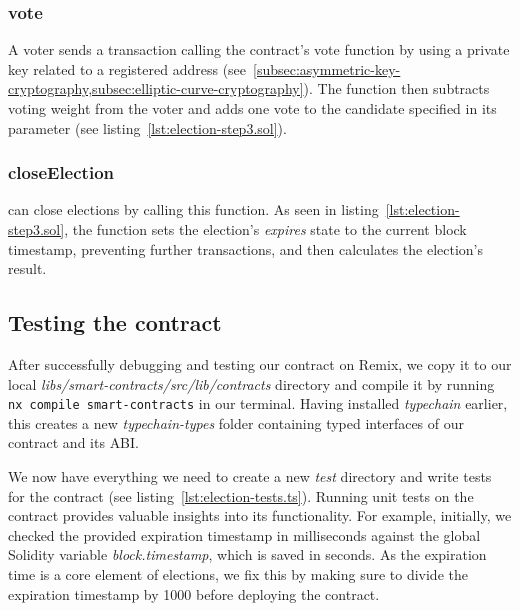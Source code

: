 \subsubsection{vote}

A voter sends a transaction calling the contract's vote function by using a private key related to a registered address (see~\cref{subsec:asymmetric-key-cryptography,subsec:elliptic-curve-cryptography}).
The function then subtracts voting weight from the voter and adds one vote to the candidate specified in its parameter (see listing~\ref{lst:election-step3.sol}).

\subsubsection{closeElection}

 can close elections by calling this function.
As seen in listing~\ref{lst:election-step3.sol}, the function sets the election's \emph{expires} state to the current block timestamp, preventing further transactions, and then calculates the election's result.

\subsection{Testing the contract}\label{subsec:testing-the-contract}

After successfully debugging and testing our contract on Remix, we copy it to our local \emph{libs/smart-contracts/src/lib/contracts} directory and compile it by running \texttt{nx compile smart-contracts} in our terminal.
Having installed \emph{typechain} earlier, this creates a new \emph{typechain-types} folder containing typed interfaces of our contract and its \gls{ABI}.

We now have everything we need to create a new \emph{test} directory and write tests for the contract (see listing~\ref{lst:election-tests.ts}).
Running unit tests on the contract provides valuable insights into its functionality.
For example, initially, we checked the provided expiration timestamp in milliseconds against the global Solidity variable \emph{block.timestamp}, which is saved in seconds.
As the expiration time is a core element of elections, we fix this by making sure to divide the expiration timestamp by 1000 before deploying the contract.



